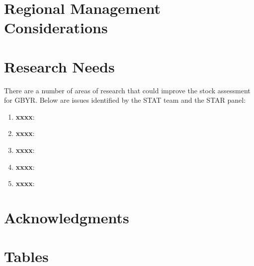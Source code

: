 \documentclass[12pt,]{article}
\begin{document}
\section{Regional Management
Considerations}\label{regional-management-considerations}

\section{Research Needs}\label{research-needs}

There are a number of areas of research that could improve the stock
assessment for GBYR. Below are issues identified by the STAT team and
the STAR panel:

\begin{enumerate}

\item \textbf{xxxx}: 

\item \textbf{xxxx}:

\item \textbf{xxxx}:

\item \textbf{xxxx}:

\item \textbf{xxxx}:

\end{enumerate}

\section{Acknowledgments}\label{acknowledgments}

\newpage

\FloatBarrier

\section{Tables}\label{tables}

\FloatBarrier
\end{document}
